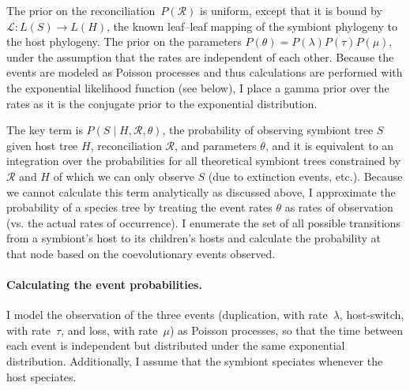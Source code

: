\documentclass[12pt,letterpaper]{article}
\newcommand{\R}{\ensuremath{\mathcal{R}}}
\begin{document}
The prior on the reconciliation~$P\left(\R\right)$ is uniform, except that it is bound by $\mathcal{L}: L\left(S\right) \rightarrow L\left(H\right)$, the known leaf--leaf mapping of the symbiont phylogeny to the host phylogeny. The prior on the parameters $P\left(\theta\right) = P\left(\lambda\right) P\left(\tau\right) P\left(\mu\right)$, under the assumption that the rates are independent of each other. Because the events are modeled as Poisson processes and thus calculations are performed with the exponential likelihood function (see below), I place a gamma prior over the rates as it is the conjugate prior to the exponential distribution.

The key term is $P\left(S\mid H,\R,\theta\right)$, the probability of observing symbiont tree $S$ given host tree $H$, reconciliation $\R$, and parameters $\theta$, and it is equivalent to an integration over the probabilities for all theoretical symbiont trees constrained by $\R$ and $H$ of which we can only observe $S$ (due to extinction events, etc.). Because we cannot calculate this term analytically as discussed above, I approximate the probability of a species tree by treating the event rates $\theta$ as rates of observation (vs. the actual rates of occurrence). I enumerate the set of all possible transitions from a symbiont's host to its children's hosts and calculate the probability at that node based on the coevolutionary events observed.

\paragraph*{Calculating the event probabilities.} 

I model the observation of the three events (duplication, with rate~$\lambda$, host-switch, with rate~$\tau$, and loss, with rate~$\mu$) as Poisson processes, so that the time between each event is independent but distributed under the same exponential distribution. Additionally, I assume that the symbiont speciates whenever the host speciates.
\end{document}

